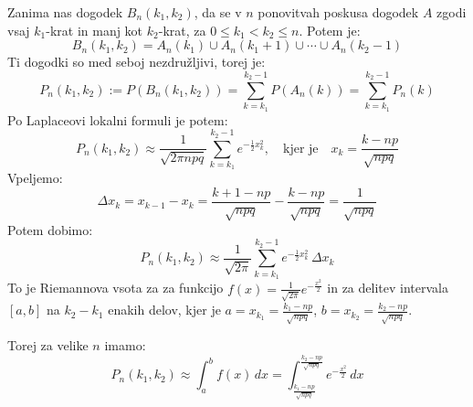 \documentclass[12pt]{book}
\theoremstyle{definition}
\theoremstyle{plain}
\theoremstyle{plain}
\theoremstyle{plain}
\theoremstyle{remark}
\begin{document}
\begin{enumerate}[label=(\alph*)]
    Zanima nas dogodek $B_n\left(k_1, k_2\right)$, da se v $n$ ponovitvah poskusa dogodek $A$ zgodi vsaj $k_1$-krat in manj kot $k_2$-krat, za $0 \leq k_1 < k_2 \leq n$. Potem je: 
    $$
    B_n\left(k_1, k_2\right)=A_n\left(k_1\right) \cup A_n\left(k_1+1\right) \cup \cdots \cup A_n\left(k_2-1\right)
    $$
    Ti dogodki so med seboj nezdružljivi, torej je:
    $$
    P_n\left(k_1, k_2\right):=P\left(B_n\left(k_1, k_2\right)\right)=\sum_{k=k_1}^{k_2-1}P\left(A_n(k)\right)=\sum_{k=k_1}^{k_2-1} P_n(k)
    $$
    Po Laplaceovi lokalni formuli je potem: 
    $$
    P_n\left(k_1, k_2\right) \approx \frac{1}{\sqrt{2 \pi n p q}} \sum_{k=k_1}^{k_2-1} e^{-\frac{1}{2}x_k^2}, \quad \text{kjer je} \quad x_k=\frac{k-n p}{\sqrt{n p q}}
    $$ 
    Vpeljemo:
    $$
    \Delta x_k=x_{k-1}-x_k=\frac{k+1-n p}{\sqrt{n p q}}-\frac{k-n p}{\sqrt{n p q}}=\frac{1}{\sqrt{n p q}}
    $$
    Potem dobimo: 
    $$
    P_n\left(k_1, k_2\right) \approx \frac{1}{\sqrt{2 \pi}} \sum_{k=k_1}^{k_2-1} e^{-\frac{1}{2} x_k^2} \, \Delta x_k
    $$
    To je Riemannova vsota za za funkcijo $f(x)=\frac{1}{\sqrt{2 \pi}} e^{-\frac{x^2}{2}}$ in za delitev intervala $[a,b]$ na $k_2 -k_1$ enakih delov, kjer je $a=x_{k_1}=\frac{k_1-n p}{\sqrt{n p q}}$, $b=x_{k_2}=\frac{k_2-n p}{\sqrt{n p q}}$.

    \begin{figure}[H]
        \centering

        \label{fig:5}
    \end{figure}

    Torej za velike $n$ imamo: 
    $$
    P_n\left(k_1, k_2\right) \approx \int_a^b f(x) \, d x=\int_{\frac{k_1-n p}{\sqrt{n p q}}}^{\frac{k_2-n p}{\sqrt{n p q}}} e^{-\frac{x^2}{2}} \, d x
    $$
    \begin{figure}[H]
        \centering
        \begin{tikzpicture}


\end{tikzpicture}
\end{figure}
\end{enumerate}
\end{document}
